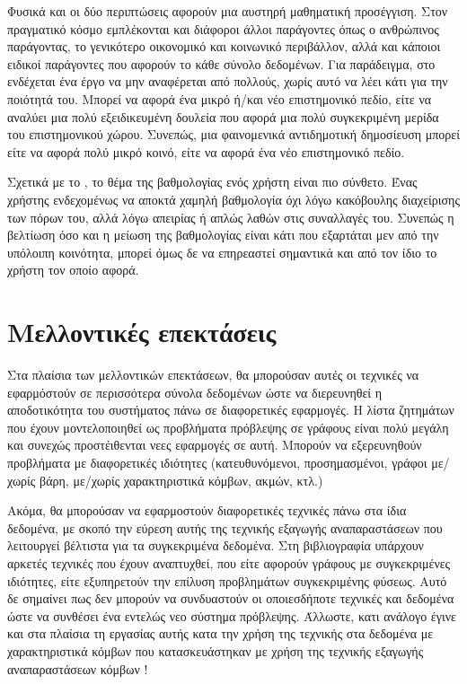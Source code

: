 Φυσικά και οι δύο περιπτώσεις αφορούν μια αυστηρή μαθηματική προσέγγιση. Στον πραγματικό κόσμο 
εμπλέκονται και διάφοροι άλλοι παράγοντες όπως ο ανθρώπινος παράγοντας, το γενικότερο οικονομικό και 
κοινωνικό περιβάλλον, αλλά και  κάποιοι ειδικοί παράγοντες που αφορούν το κάθε σύνολο δεδομένων.
Για παράδειγμα, στο  ενδέχεται ένα έργο να μην αναφέρεται από πολλούς, χωρίς αυτό να 
λέει κάτι για την ποιότητά του. Μπορεί να αφορά ένα μικρό ή/και νέο επιστημονικό πεδίο, είτε να
αναλύει μια πολύ εξειδικευμένη δουλεία που αφορά μια πολύ συγκεκριμένη μερίδα του επιστημονικού χώρου.
Συνεπώς, μια φαινομενικά αντιδημοτική δημοσίευση μπορεί είτε να αφορά πολύ μικρό κοινό, είτε να
αφορά ένα νέο επιστημονικό πεδίο.

Σχετικά με το , το θέμα της βαθμολογίας ενός χρήστη είναι 
πιο σύνθετο. Ένας χρήστης ενδεχομένως να αποκτά χαμηλή βαθμολογία όχι λόγω κακόβουλης διαχείρισης των
πόρων του, αλλά λόγω απειρίας ή απλώς λαθών στις συναλλαγές του. Συνεπώς η βελτίωση όσο και η μείωση της
βαθμολογίας είναι κάτι που εξαρτάται μεν από την υπόλοιπη κοινότητα, μπορεί όμως δε να επηρεαστεί 
σημαντικά και από τον ίδιο το χρήστη τον οποίο αφορά.


\section{Μελλοντικές επεκτάσεις}

Στα πλαίσια των μελλοντικών επεκτάσεων, θα μπορούσαν αυτές οι τεχνικές  να εφαρμόστούν σε
περισσότερα σύνολα δεδομένων ώστε να διερευνηθεί η αποδοτικότητα του συστήματος πάνω σε διαφορετικές
εφαρμογές. Η λίστα ζητημάτων που έχουν μοντελοποιηθεί ως προβλήματα πρόβλεψης σε γράφους είναι πολύ μεγάλη
και συνεχώς προστέιθενται νεες εφαρμογές σε αυτή. Μπορούν να εξερευνηθούν προβλήματα με διαφορετικές
ιδιότητες (κατευθυνόμενοι, προσημασμένοι, γράφοι με/χωρίς βάρη, με/χωρίς χαρακτηριστικά κόμβων, ακμών,
κτλ.)

Ακόμα, θα μπορούσαν να εφαρμοστούν διαφορετικές τεχνικές πάνω στα ίδια δεδομένα, με σκοπό
την εύρεση αυτής της τεχνικής εξαγωγής αναπαραστάσεων που λειτουργεί βέλτιστα για τα συγκεκριμένα
δεδομένα. Στη βιβλιογραφία υπάρχουν αρκετές τεχνικές που έχουν αναπτυχθεί, που είτε αφορούν γράφους με 
συγκεκριμένες ιδιότητες, είτε εξυπηρετούν την επίλυση προβλημάτων συγκεκριμένης φύσεως. Αυτό δε σημαίνει
πως δεν μπορούν να συνδυαστούν οι οποιεσδήποτε τεχνικές και δεδομένα ώστε να συνθέσει ένα
εντελώς νεο σύστημα πρόβλεψης. Άλλωστε, κατι ανάλογο έγινε και στα πλαίσια τη εργασίας αυτής κατα
την χρήση της τεχνικής  στα δεδομένα  με χαρακτηριστικά κόμβων που 
κατασκευάστηκαν με χρήση της τεχνικής εξαγωγής αναπαραστάσεων κόμβων !

